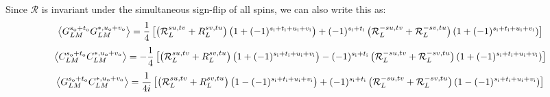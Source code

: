 \documentclass[reprint,prd, superscriptaddress, tightenlines, longbibliography, nofootinbib, eqsecnum, amsfonts, amsmath, floatfix, notitlepage, onecolumn]{revtex4-1}
\newcommand{\si}[0]{{s_{\rm i}}}
\newcommand{\ti}[0]{{t_{\rm i}}}
\newcommand{\ui}[0]{{u_{\rm i}}}
\newcommand{\vi}[0]{{v_{\rm i}}}
\newcommand{\so}[0]{{s_{\rm o}}}
\renewcommand{\to}[0]{{t_{\rm o}}}
\newcommand{\uo}[0]{{u_{\rm o}}}
\newcommand{\vo}[0]{{v_{\rm o}}}
\newcommand{\av}[1]{\left\langle #1 \right\rangle}
\begin{document}
Since $\mathcal R$ is invariant under the simultaneous sign-flip of all spins, we can also write this as:
\begin{equation}
	\av{G^{\so + \to}_{LM} G^{*, \uo + \vo}_{L M} } = \frac 14\left[ \left(\mathcal R^{su, tv}_L  + R^{sv, tu}_L\right)\left(1 + (-1)^{\si + \ti + \ui + \vi} \right)  + (-1)^{\si + \ti} \left(\mathcal R^{-su, tv}_L + \mathcal R_L^{-sv, tu} \right)(1 + (-1)^{\si + \ti + \ui + \vi}) \right]
\end{equation}
\begin{equation}
	\av{C^{\so + \to}_{LM} C^{*, \uo + \vo}_{L M} } =- \frac 14\left[ \left(\mathcal R^{su, tv}_L  + R^{sv, tu}_L\right)\left(1 + (-1)^{\si + \ti + \ui + \vi} \right)  - (-1)^{\si + \ti} \left(\mathcal R^{-su, tv}_L + \mathcal R_L^{-sv, tu} \right)(1 + (-1)^{\si + \ti + \ui + \vi}) \right]
\end{equation}
\begin{equation}
	\av{G^{\so + \to}_{LM} C^{*, \uo + \vo}_{L M} } = \frac 1{4i}\left[ \left(\mathcal R^{su, tv}_L  + R^{sv, tu}_L\right)\left(1 - (-1)^{\si + \ti + \ui + \vi} \right)  + (-1)^{\si + \ti} \left(\mathcal R^{-su, tv}_L + \mathcal R_L^{-sv, tu} \right)(1 - (-1)^{\si + \ti + \ui + \vi}) \right]
\end{equation}
\color{red}{?}\color{black}
\end{document}
